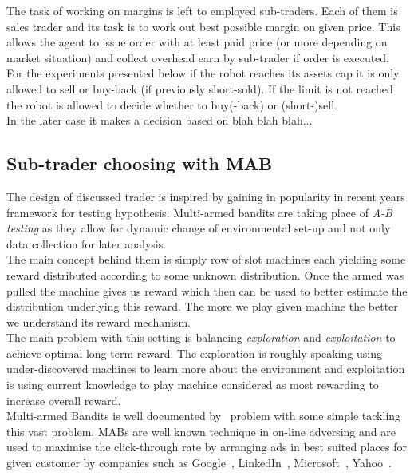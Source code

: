 \documentclass{llncs}
\begin{document}
The task of working on margins is left to employed sub-traders. Each of them is sales trader and its task is to work out best possible margin on given price. This allows the agent to issue order with at least paid price (or more depending on market situation) and collect overhead earn by sub-trader if order is executed.\\
For the experiments presented below if the robot reaches its assets cap it is only allowed to sell or buy-back (if previously short-sold). If the limit is not reached the robot is allowed to decide whether to buy(-back) or (short-)sell.\\
In the later case it makes a decision based on blah blah blah...

\subsection{Sub-trader choosing with MAB}
The design of discussed trader is inspired by gaining in popularity in recent years framework for testing hypothesis. Multi-armed bandits are taking place of \emph{A-B testing} as they allow for dynamic change of environmental set-up and not only data collection for later analysis.\\
The main concept behind them is simply row of slot machines each yielding some reward distributed according to some unknown distribution. Once the armed was pulled the machine gives us reward which then can be used to better estimate the distribution underlying this reward. The more we play given machine the better we understand its reward mechanism.\\
The main problem with this setting is balancing \emph{exploration} and \emph{exploitation} to achieve optimal long term reward. The exploration is roughly speaking using under-discovered machines to learn more about the environment and exploitation is using current knowledge to play machine considered as most rewarding to increase overall reward.\\
Multi-armed Bandits is well documented by~\cite{berry+firstedt,gittins+glazebrook+weber} problem with some simple tackling this vast problem. MABs are well known technique in on-line adversing and are used to maximise the click-through rate by arranging ads in best suited places for given customer by companies such as Google~\cite{AYPSze12,ASMB:ASMB874}, LinkedIn~\cite{Tang:2013:AAF:2505515.2514700}, Microsoft~\cite{graepel2010web}, Yahoo~\cite{Li:2010:CAP:1772690.1772758}.\\
\end{document}
